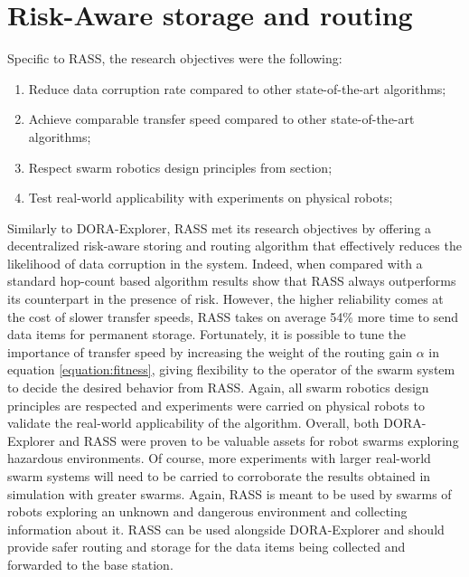 \section{Risk-Aware storage and routing}
Specific to RASS, the research objectives were the following:

\begin{enumerate}
    \item Reduce data corruption rate compared to other state-of-the-art algorithms;
    \item Achieve comparable transfer speed compared to other state-of-the-art algorithms;
    \item Respect swarm robotics design principles from section;
    \item Test real-world applicability with experiments on physical robots;
\end{enumerate}

Similarly to DORA-Explorer, RASS met its research objectives by offering a decentralized risk-aware storing and routing algorithm that effectively reduces the likelihood of data corruption in the system. Indeed, when compared with a standard hop-count based algorithm results show that RASS always outperforms its counterpart in the presence of risk. However, the higher reliability comes at the cost of slower transfer speeds, RASS takes on average 54\% more time to send data items for permanent storage. Fortunately, it is possible to tune the importance of transfer speed by increasing the weight of the routing gain $\alpha$ in equation \ref{equation:fitness}, giving flexibility to the operator of the swarm system to decide the desired behavior from RASS. Again, all swarm robotics design principles are respected and experiments were carried on physical robots to validate the real-world applicability of the algorithm. Overall, both DORA-Explorer and RASS were proven to be valuable assets for robot swarms exploring hazardous environments. Of course, more experiments with larger real-world swarm systems will need to be carried to corroborate the results obtained in simulation with greater swarms. Again, RASS is meant to be used by swarms of robots exploring an unknown and dangerous environment and collecting information about it. RASS can be used alongside DORA-Explorer and should provide safer routing and storage for the data items being collected and forwarded to the base station. 
 